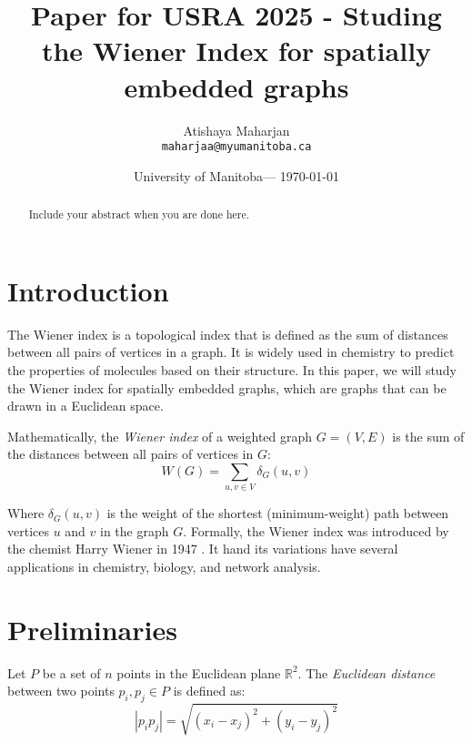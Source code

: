 \documentclass{article}
\title{Paper for USRA 2025 - Studing the Wiener Index for spatially embedded graphs}
\author{Atishaya Maharjan\\ \texttt{maharjaa@myumanitoba.ca}}
\date{University of Manitoba--- \today}
\begin{document}
\maketitle
\begin{abstract}
	Include your abstract when you are done here.
\end{abstract}

\section{Introduction}

The Wiener index is a topological index that is defined as the sum of distances between all pairs of vertices in a graph. It is widely used in chemistry to predict the properties of molecules based on their structure. In this paper, we will study the Wiener index for spatially embedded graphs, which are graphs that can be drawn in a Euclidean space.

Mathematically, the \textit{Wiener index} of a weighted graph $G = (V, E)$ is the sum of the distances between all pairs of vertices in $G$:
\begin{equation*}
	W(G) = \sum_{u, v \in V} \delta_G(u, v)
\end{equation*}

Where $\delta_G(u, v)$ is the weight of the shortest (minimum-weight) path between vertices $u$ and $v$ in the graph $G$.
Formally, the Wiener index was introduced by the chemist Harry Wiener in 1947 \cite{wiener_1947_structural_paraffin}. It hand its variations have several applications in chemistry, biology, and network analysis. 


\section{Preliminaries}

Let $P$ be a set of $n$ points in the Euclidean plane $\mathbb{R}^2$. The \textit{Euclidean distance} between two points $p_i, p_j \in P$ is defined as:
\begin{equation*}
	|p_ip_j| = \sqrt{(x_i - x_j)^2 + (y_i - y_j)^2}
\end{equation*}
\end{document}
